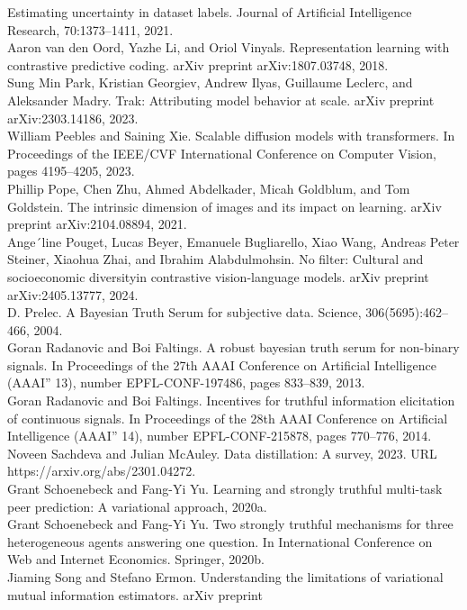 Estimating uncertainty in dataset labels. Journal of Artificial
Intelligence Research, 70:1373--1411, 2021.\\
Aaron van den Oord, Yazhe Li, and Oriol Vinyals. Representation learning
with contrastive predictive coding. arXiv preprint arXiv:1807.03748,
2018.\\
Sung Min Park, Kristian Georgiev, Andrew Ilyas, Guillaume Leclerc, and
Aleksander Madry. Trak: Attributing model behavior at scale. arXiv
preprint arXiv:2303.14186, 2023.\\
William Peebles and Saining Xie. Scalable diffusion models with
transformers. In Proceedings of the IEEE/CVF International Conference on
Computer Vision, pages 4195--4205, 2023.\\
Phillip Pope, Chen Zhu, Ahmed Abdelkader, Micah Goldblum, and Tom
Goldstein. The intrinsic dimension of images and its impact on learning.
arXiv preprint arXiv:2104.08894, 2021.\\
Ange´line Pouget, Lucas Beyer, Emanuele Bugliarello, Xiao Wang, Andreas
Peter Steiner, Xiaohua Zhai, and Ibrahim Alabdulmohsin. No filter:
Cultural and socioeconomic diversityin contrastive vision-language
models. arXiv preprint arXiv:2405.13777, 2024.\\
D. Prelec. A Bayesian Truth Serum for subjective data. Science,
306(5695):462--466, 2004.\\
Goran Radanovic and Boi Faltings. A robust bayesian truth serum for
non-binary signals. In Proceedings of the 27th AAAI Conference on
Artificial Intelligence (AAAI'' 13), number EPFL-CONF-197486, pages
833--839, 2013.\\
Goran Radanovic and Boi Faltings. Incentives for truthful information
elicitation of continuous signals. In Proceedings of the 28th AAAI
Conference on Artificial Intelligence (AAAI'' 14), number
EPFL-CONF-215878, pages 770--776, 2014.\\
Noveen Sachdeva and Julian McAuley. Data distillation: A survey, 2023.
URL https://arxiv.org/abs/2301.04272.\\
Grant Schoenebeck and Fang-Yi Yu. Learning and strongly truthful
multi-task peer prediction: A variational approach, 2020a.\\
Grant Schoenebeck and Fang-Yi Yu. Two strongly truthful mechanisms for
three heterogeneous agents answering one question. In International
Conference on Web and Internet Economics. Springer, 2020b.\\
Jiaming Song and Stefano Ermon. Understanding the limitations of
variational mutual information estimators. arXiv preprint
